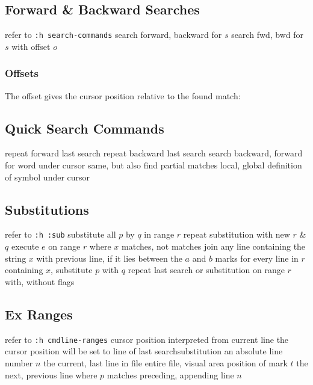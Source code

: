 \subsection{Forward \& Backward Searches}	{refer to {\tt :h search-commands}}
	{search forward, backward for $s$}
	{search fwd, bwd for $s$ with offset $o$}

\subsubsection{Offsets}	{}
The offset gives the cursor position relative to the found match:\\

\subsection{Quick Search Commands}	{}
	{repeat forward last search}
	{repeat backward last search}
\cmdS{\# * }	{search backward, forward for word under cursor}
	{same, but also find partial matches}
	{local, global definition of symbol under cursor}

\subsection{Substitutions}	{refer to {\tt :h :sub}}
	{substitute all $p$ by $q$ in range $r$}
	{repeat substitution with new $r$ \& $q$}
	{execute $e$ on range $r$ where $x$ mat\-ches, not matches}
	{join any line containing the string $x$ with
previous line, if it lies between the $a$ and $b$ marks}
	{for every line in $r$ containing $x$, substitute $p$ with $q$}
	{repeat last search or substitution on range $r$ with, without flags}

\subsection{Ex Ranges}	{refer to {\tt :h cmdline-ranges}}
\cmdOper{, }	{cursor position interpreted from current line}
\cmdOper{;\ }	{the cursor position will be set to line of last search\or substitution}
	{an absolute line number $n$}
	{the current, last line in file}
\cmdOper{\% * }	{entire file, visual area}
	{position of mark $t$}
	{the next, previous line where $p$ matches}
	{preceding, appending line $n$}

